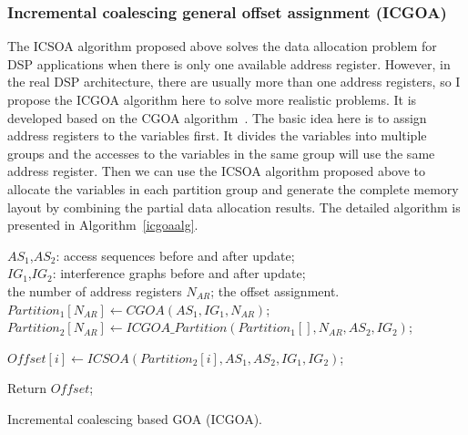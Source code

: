 \subsubsection{Incremental coalescing general offset assignment (ICGOA)}
The ICSOA algorithm proposed above solves the data allocation problem for DSP applications when there is only one available address register. However, in the real DSP architecture, there are usually more than one address registers, so I propose the ICGOA algorithm here to solve more realistic problems. It is developed based on the CGOA algorithm~\cite{related:ottoni}.
The basic idea here is to assign address registers to the variables first. It divides the variables into multiple groups and the accesses to the variables in the same group will use the same address register.
Then we can use the ICSOA algorithm proposed above to allocate the variables in each partition group and generate the complete memory layout by combining the partial data allocation
results. The detailed algorithm is presented in Algorithm~\ref{icgoaalg}. 

\begin{algorithm}[htbp]
\singlespace
\begin{algorithmic}[1]
\singlespace
\REQUIRE $\textit{AS}_1$,$\textit{AS}_2$: access sequences before and after update; \\
				 $\textit{IG}_1$,$\textit{IG}_2$: interference graphs before and after update;\\
				 the number of address registers $N_{AR}$;
\ENSURE the offset assignment.\\
\STATE $\textit{Partition}_1[N_{AR}] \leftarrow \textit{CGOA}(\textit{AS}_1,\textit{IG}_1,N_{AR})$;\\
\STATE $\textit{Partition}_2[N_{AR}] \leftarrow  \textit{ICGOA}\_\textit{Partition}(\textit{Partition}_1[],N_{AR},\textit{AS}_2,\textit{IG}_2)$;

\STATE $\textit{Offset}[i] \leftarrow ICSOA(\textit{Partition}_2[i],\textit{AS}_1,\textit{AS}_2,\textit{IG}_1,\textit{IG}_2)$;
\ENDFOR

\STATE Return $\textit{Offset}$;
\caption{Incremental coalescing based GOA (ICGOA).}
\label{icgoaalg}
\end{algorithmic}
\end{algorithm}

